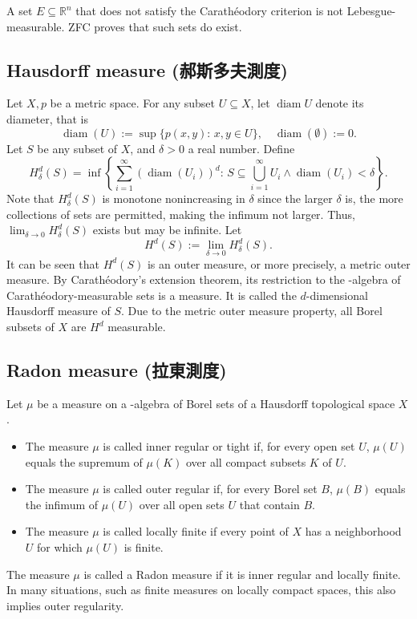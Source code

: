 \documentclass[a4paper,12pt]{article}
\begin{document}
A set $E\subseteq\mathbb{R}^n$ that does not satisfy the Carathéodory criterion is not Lebesgue-measurable. ZFC proves that such sets do exist.
\subsection{Hausdorff measure (郝斯多夫測度)}
Let $X,p$ be a metric space. For any subset $U\subseteq X$, let $\operatorname {diam} U$ denote its diameter, that is
\[\operatorname {diam} (U):=\sup\{p (x,y):\,x,y\in U\},\quad \operatorname {diam} (\emptyset) :=0.\]
Let $S$ be any subset of $X$, and $\delta >0$ a real number. Define
\[H_\delta^d(S)=\inf\left\{\sum_{i=1}^\infty \left(\operatorname{diam}(U_i)\right)^d:\, S\subseteq\bigcup_{i=1}^\infty U_i\land\operatorname{diam}(U_i)<\delta \right\}.\]
Note that $H_\delta^d(S)$ is monotone nonincreasing in $\delta$ since the larger $\delta$ is, the more collections of sets are permitted, making the infimum not larger. Thus, 
$\lim_{\delta\to 0}H_\delta^d(S)$ exists but may be infinite. Let
\[H^d(S):=\lim_{\delta \to 0}H_\delta^d(S).\]
It can be seen that $H^d(S)$ is an outer measure, or more precisely, a metric outer measure. By Carathéodory's extension theorem, its restriction to the \text{\textsigma}-algebra of Carathéodory-measurable sets is a measure. It is called the $d$-dimensional Hausdorff measure of $S$. Due to the metric outer measure property, all Borel subsets of $X$ are $H^d$ measurable.
\subsection{Radon measure (拉東測度)}
Let $\mu$ be a measure on a \text{\textsigma}-algebra of Borel sets of a Hausdorff topological space $X$.
\begin{itemize}
\item The measure $\mu$ is called inner regular or tight if, for every open set $U$, $\mu(U)$ equals the supremum of $\mu(K)$ over all compact subsets $K$ of $U$.
\item The measure $\mu$ is called outer regular if, for every Borel set $B$, $\mu(B)$ equals the infimum of $\mu(U)$ over all open sets $U$ that contain $B$.
\item The measure $\mu$ is called locally finite if every point of $X$ has a neighborhood $U$ for which $\mu(U)$ is finite.
\end{itemize}
The measure $\mu$ is called a Radon measure if it is inner regular and locally finite. In many situations, such as finite measures on locally compact spaces, this also implies outer regularity.
\end{document}
